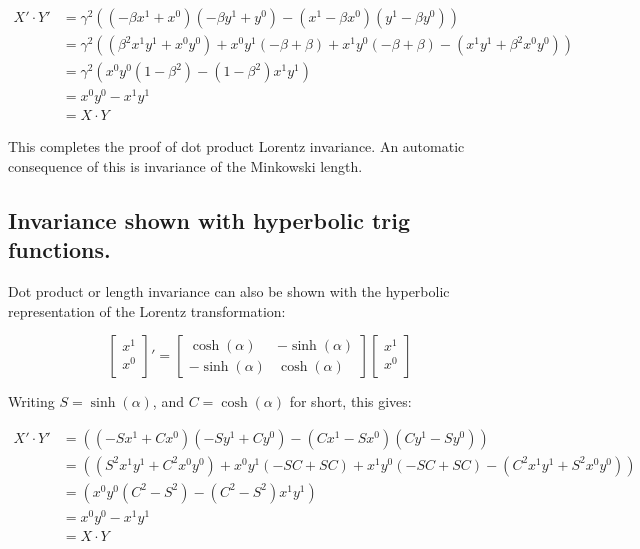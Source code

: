 \begin{align*}
X' \cdot Y' 
&= \gamma^2 \left( (-\beta x^1 + x^0)(-\beta y^1 + y^0) -(x^1 -\beta x^0) (y^1 -\beta y^0) \right) \\
&= \gamma^2 \left( (\beta^2 x^1 y^1 + x^0 y^0) + x^0 y^1( -\beta + \beta ) + x^1 y^0( -\beta + \beta ) -(x^1 y^1 + \beta^2 x^0 y^0) \right) \\
&= \gamma^2 \left( x^0 y^0 (1-\beta^2) - (1-\beta^2) x^1 y^1 \right) \\
&= x^0 y^0 - x^1 y^1 \\
&= X \cdot Y
\end{align*}

This completes the proof of dot product Lorentz invariance.  An automatic consequence of this is invariance
of the Minkowski length.

\subsection{Invariance shown with hyperbolic trig functions. }

Dot product or length invariance can also be shown with the hyperbolic representation of the Lorentz transformation:

\begin{equation}\label{eqn:fVecDotInv:hyperbolicmatrix}
{
\begin{bmatrix}
x^1 \\
x^0 \\
\end{bmatrix}
}'
=
\begin{bmatrix}
\cosh(\alpha) & -\sinh(\alpha) \\
-\sinh(\alpha) & \cosh(\alpha)
\end{bmatrix}
\begin{bmatrix}
x^1 \\
x^0 \\
\end{bmatrix}
\end{equation}

Writing $S=\sinh(\alpha)$, and $C=\cosh(\alpha)$ for short, this gives:

\begin{align*}
X' \cdot Y' 
&= \left( (-S x^1 + C x^0)(-S y^1 + C y^0) -(C x^1 -S x^0) (C y^1 -S y^0) \right) \\
&= \left( (S^2  x^1 y^1 + C^2  x^0 y^0) + x^0 y^1( -SC + SC ) + x^1 y^0( -SC + SC ) -(C^2  x^1 y^1 + S^2  x^0 y^0) \right) \\
&= \left( x^0 y^0 (C^2  -S^2 ) - (C^2 -S^2 ) x^1 y^1 \right) \\
&= x^0 y^0 - x^1 y^1 \\
&= X \cdot Y
\end{align*}


